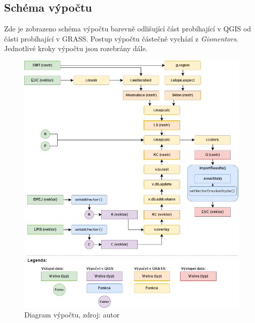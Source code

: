 \subsection{Schéma výpočtu}
Zde je zobrazeno schéma výpočtu barevně odlišující část probíhající v QGIS od části probíhající v GRASS. Postup výpočtu částečně vychází z \textit{Gismentors}\cite{gismentors}. Jednotlivé kroky výpočtu jsou rozebrány dále. 
\begin{figure}[H]
    \centering \includegraphics[scale=0.6]{./pictures/diagram.png}
      \caption[Diagram výpočtu]
      {Diagram výpočtu, zdroj: autor}
      \label{diagram}
\end{figure}
\newpage

